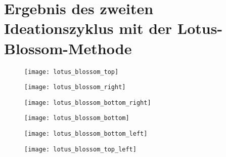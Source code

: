 \section{Ergebnis des zweiten Ideationszyklus mit der Lotus-Blossom-Methode} \label{appendix:lotus_blossom}

\begin{figure}[H]
  \centering
  \texttt{[image: lotus\_blossom\_top]}
  \caption{}
  \label{fig:lotus_blossom_top}
\end{figure}
\begin{figure}[H]
  \centering
  \texttt{[image: lotus\_blossom\_right]}
  \caption{}
  \label{fig:lotus_blossom_right}
\end{figure}
\begin{figure}[H]
  \centering
  \texttt{[image: lotus\_blossom\_bottom\_right]}
  \caption{}
  \label{fig:lotus_blossom_bottom_right}
\end{figure}
\begin{figure}[H]
  \centering
  \texttt{[image: lotus\_blossom\_bottom]}
  \caption{}
  \label{fig:lotus_blossom_bottom}
\end{figure}
\begin{figure}[H]
  \centering
  \texttt{[image: lotus\_blossom\_bottom\_left]}
  \caption{}
  \label{fig:lotus_blossom_bottom_left}
\end{figure}
\begin{figure}[H]
  \centering
  \texttt{[image: lotus\_blossom\_top\_left]}
  \caption{}
  \label{fig:lotus_blossom_top_left}
\end{figure}